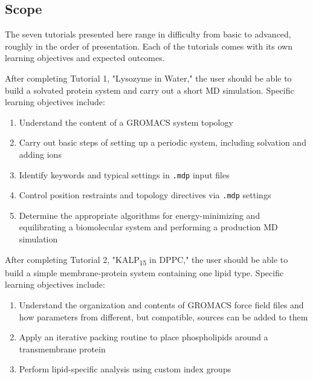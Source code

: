 \documentclass[9pt,tutorial]{livecoms}
\begin{document}
\subsection{Scope}



The seven tutorials presented here range in difficulty from basic to advanced, roughly in the order of presentation. Each of the tutorials comes with its own learning objectives and expected outcomes.

After completing Tutorial 1, "Lysozyme in Water," the user should be able to build a solvated protein system and carry out a short MD simulation. Specific learning objectives include:
\begin{enumerate}
	\item Understand the content of a GROMACS system topology
	\item Carry out basic steps of setting up a periodic system, including solvation and adding ions
	\item Identify keywords and typical settings in \texttt{.mdp} input files
	\item Control position restraints and topology directives via \texttt{.mdp} settings
	\item Determine the appropriate algorithms for energy-minimizing and equilibrating a biomolecular system and performing a production MD simulation
\end{enumerate}

After completing Tutorial 2, "KALP\textsubscript{15} in DPPC," the user should be able to build a simple membrane-protein system containing one lipid type. Specific learning objectives include:
\begin{enumerate}
	\item Understand the organization and contents of GROMACS force field files and how parameters from different, but compatible, sources can be added to them
	\item Apply an iterative packing routine to place phospholipids around a transmembrane protein
	\item Perform lipid-specific analysis using custom index groups
\end{enumerate}
\end{document}
